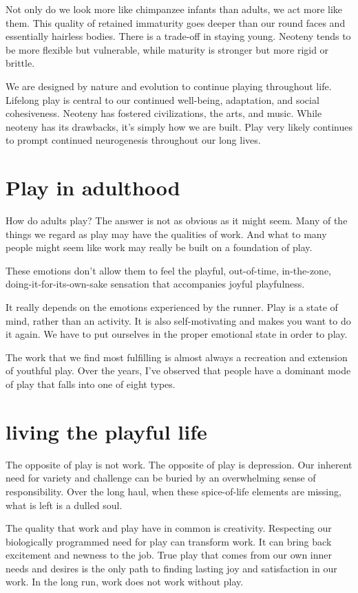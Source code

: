 \documentclass[ebook,12pt,oneside,openany]{memoir}
\begin{document}
Not only do we look more like chimpanzee infants than adults, we act more like them.
This quality of retained immaturity goes deeper than our round faces and essentially hairless bodies.
There is a trade-off in staying young. Neoteny tends to be more flexible but vulnerable, while maturity is stronger but more rigid or brittle.

We are designed by nature and evolution to continue playing throughout life.
Lifelong play is central to our continued well-being, adaptation, and social cohesiveness.
Neoteny has fostered civilizations, the arts, and music. 
While neoteny has its drawbacks, it's simply how we are built.
Play very likely continues to prompt continued neurogenesis throughout our long lives.

\section{Play in adulthood}
How do adults play? The answer is not as obvious as it might seem. 
Many of the things we regard as play may have the qualities of work.
And what to many people might seem like work may really be built on a foundation of play.

These emotions don't allow them to feel the playful, out-of-time, in-the-zone, doing-it-for-its-own-sake sensation that 
accompanies joyful playfulness.

It really depends on the emotions experienced by the runner.
Play is a state of mind, rather than an activity. 
It is also self-motivating and makes you want to do it again. 
We have to put ourselves in the proper emotional state in order to play.

The work that we find most fulfilling is almost always a recreation and extension
of youthful play. 
Over the years, I've observed that people have a dominant mode of play that falls into one of eight types. 

\section{living the playful life}
The opposite of play is not work. The opposite of play is depression.
Our inherent need for variety and challenge can be buried by an overwhelming sense of responsibility.
Over the long haul, when these spice-of-life elements are missing, what is left is a dulled soul.

The quality that work and play have in common is creativity. 
Respecting our biologically programmed need for play can transform work.
It can bring back excitement and newness to the job. 
True play that comes from our own inner needs and desires is the only path to finding lasting joy
and satisfaction in our work. In the long run, work does not work without play.
\end{document}
